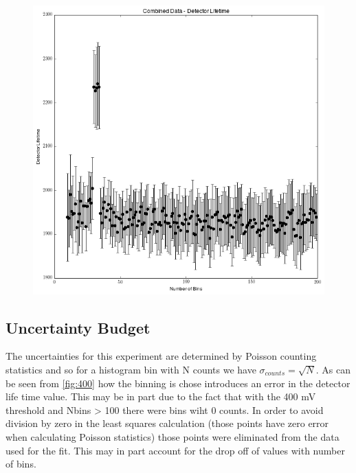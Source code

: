 \documentclass[11pt,letterpaper]{article}
\begin{document}
\begin{figure}[h!]
  \centering
      \includegraphics[scale=.7]{combinemVDect.png}
      \caption{}
      \label{fig:combine}
\end{figure}
\subsection{Uncertainty Budget}
The uncertainties for this experiment are determined by Poisson counting statistics and so for a histogram bin with N counts we have $\sigma_{counts}=\sqrt{N}$. As can be seen from \ref{fig:400} how the binning is chose introduces an error in the detector life time value. This may be in part due to the fact that with the 400 mV threshold and Nbins > 100 there were bins wiht 0 counts. In order to avoid division by zero in the least squares calculation (those points have zero error when calculating Poisson statistics) those points were eliminated from the data used for the fit. This may in part account for the drop off of values with number of bins.
\end{document}
